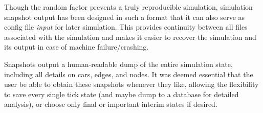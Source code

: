 \par Though the random factor prevents a truly reproducible simulation, simulation snapshot output has been designed in such a format that it can also serve as config file \textit{input} for later simulation.  This provides continuity between all files associated with the simulation and makes it easier to recover the simulation and its output in case of machine failure/crashing. \\

\par Snapshots output a human-readable dump of the entire simulation state, including all details on cars, edges, and nodes.  It was deemed essential that the user be able to obtain these snapshots whenever they like, allowing the flexibility to save every single tick state (and maybe dump to a database for detailed analysis), or choose only final or important interim states if desired.